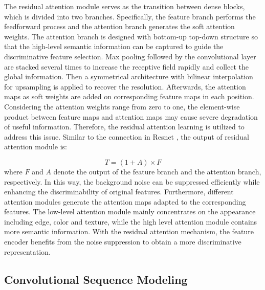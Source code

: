 \documentclass[letterpaper]{article} %
\begin{document}
The residual attention module serves as the transition between dense blocks, which is divided into two branches. Specifically, the feature branch performs the feedforward process and the attention branch generates the soft attention weights. The attention branch is designed with bottom-up top-down structure so that the high-level semantic information can be captured to guide the discriminative feature selection. Max pooling followed by the convolutional layer are stacked several times to increase the receptive field rapidly and collect the global information. Then a symmetrical architecture with bilinear interpolation for upsampling is applied to recover the resolution. Afterwards, the attention maps as soft weights are added on corresponding feature maps in each position. Considering the attention weights range from zero to one, the element-wise product between feature maps and attention maps may cause severe degradation of useful information. Therefore, the residual attention learning is utilized to address this issue. Similar to the connection in Resnet \cite{he2016deep}, the output of residual attention module is:\par
\begin{equation}
T = (1+A) \times F
\end{equation}
where $F$ and $A$ denote the output of the feature branch and the attention branch, respectively. In this way, the background noise can be suppressed efficiently while enhancing the discriminability of original features. Furthermore, different attention modules generate the attention maps adapted to the corresponding features. The low-level attention module mainly concentrates on the appearance including edge, color and texture, while the high level attention module contains more semantic information. With the residual attention mechanism, the feature encoder benefits from the noise suppression to obtain a more discriminative representation.

\subsection{Convolutional Sequence Modeling}
\end{document}
